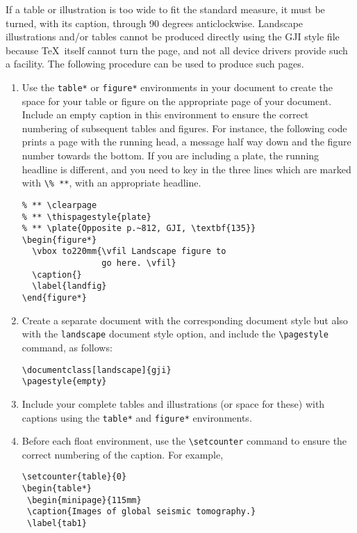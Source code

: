 If a table or illustration is too wide to fit the standard measure, it
must be turned, with its caption, through 90 degrees anticlockwise.
Landscape illustrations and/or tables cannot be produced directly
using the GJI style file because \TeX\ itself cannot turn the
page, and not all device drivers provide such a facility.
The following procedure can be used to produce such pages.
\begin{enumerate}
  \item Use the \verb"table*" or \verb"figure*" environments in your
        document to create the space for your table or figure on the
        appropriate page of your document. Include an empty
        caption in this environment to ensure the correct
        numbering of subsequent tables and figures. For instance, the
        following code prints a page with the running head, a message
        half way down and the figure number towards the bottom. If you
        are including a plate, the running headline is different, and you
        need to key in the three lines which are marked with \verb"\% **",
        with an appropriate headline.
\begin{verbatim}
% ** \clearpage
% ** \thispagestyle{plate}
% ** \plate{Opposite p.~812, GJI, \textbf{135}}
\begin{figure*}
  \vbox to220mm{\vfil Landscape figure to
                go here. \vfil}
  \caption{}
  \label{landfig}
\end{figure*}
\end{verbatim}
\item Create a separate document with the corresponding document style
      but also with the \verb"landscape" document style option, and
      include the \verb"\pagestyle" command, as follows:
\begin{verbatim}
\documentclass[landscape]{gji}
\pagestyle{empty}
\end{verbatim}
  \item Include your complete tables and illustrations (or space for
        these) with captions using the \verb"table*" and \verb"figure*"
        environments.
  \item Before each float environment, use the
        \verb"\setcounter" command to ensure the correct numbering of
        the caption. For example,
\begin{verbatim}
\setcounter{table}{0}
\begin{table*}
 \begin{minipage}{115mm}
 \caption{Images of global seismic tomography.}
 \label{tab1}

\end{verbatim}
\end{enumerate}
